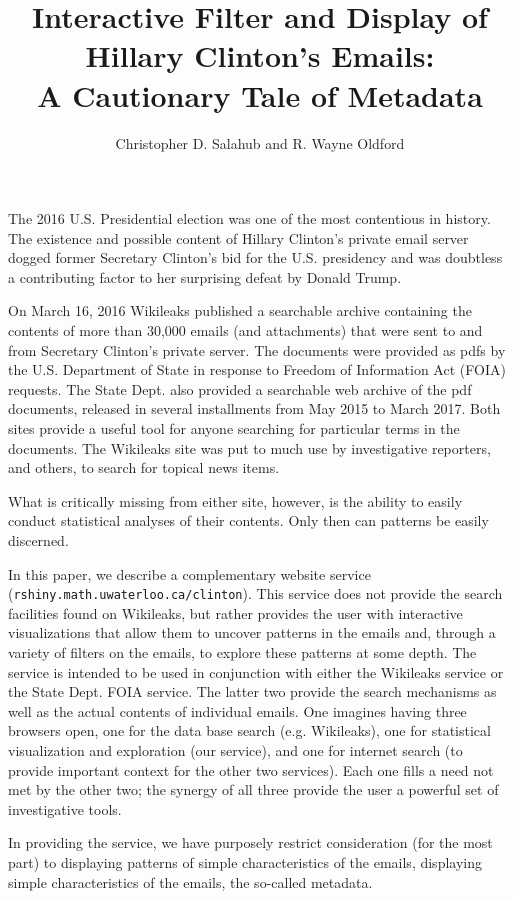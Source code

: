 \documentclass[journal]{vgtc}                %
\title{Interactive Filter and Display of Hillary Clinton's Emails: \\A Cautionary Tale of Metadata}
\author{Christopher D. Salahub and R. Wayne Oldford}
\begin{document}
\maketitle
The 2016 U.S. Presidential election was one of the most contentious in history.  The existence and possible content of Hillary Clinton's private email server dogged former Secretary Clinton's bid for the U.S. presidency and was doubtless a contributing factor to her surprising defeat by Donald Trump.

On March 16, 2016 Wikileaks  published a searchable archive \cite{Wikileaks} containing the contents of more than 30,000 emails (and attachments) that were sent to and from Secretary Clinton's private server.  The documents were provided as pdfs by the U.S. Department of State in response to Freedom of Information Act (FOIA) \cite{FOIA} requests.  The State Dept. also provided a searchable web archive of the pdf documents, released in several installments from May 2015 to March 2017\cite{StateDeptFOIA}.   Both sites provide a  useful tool for anyone searching for particular terms in the documents.  The Wikileaks site was put to much use by investigative reporters, and others, to search for topical news items.

What is critically missing from either site, however, is the ability to easily conduct statistical analyses of their contents.  Only then can patterns be easily discerned.  

In this paper, we describe a complementary website service (\texttt{rshiny.math.uwaterloo.ca/clinton}).  This service does not provide the search facilities found on Wikileaks, but rather provides the user with interactive visualizations that allow them to uncover patterns in the emails and, through a variety of filters on the emails,  to explore these patterns at some depth.  The service is intended to be used in conjunction with either the Wikileaks service or the State Dept. FOIA service.   The latter two provide the search mechanisms as well as the actual contents of individual emails.  One imagines having three browsers open, one for the data base search (e.g. Wikileaks), one for statistical visualization and exploration (our service), and one for internet search (to provide important context for the other two services). Each one fills a need not met by the other two; the synergy of all three provide the user a powerful set of investigative tools.

In providing the service, we have purposely restrict consideration (for the most part) to displaying patterns of simple characteristics of the emails, displaying simple characteristics of the emails,  the so-called metadata.   
\end{document}
